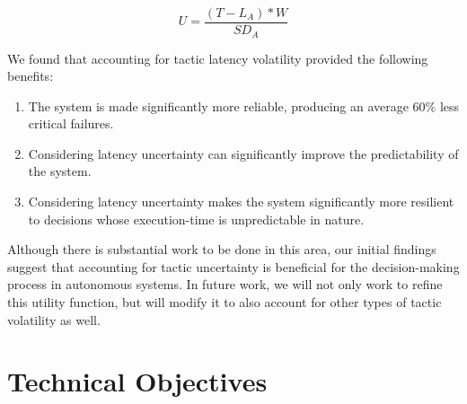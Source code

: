 \documentclass{article}
\begin{document}
\begin{equation} 
    U = \dfrac{(T - L_A)*W}{SD_A}
  	\label{eq:proposedLVA}
\end{equation}


We found that accounting for tactic latency volatility provided the following benefits:

\begin{enumerate}[noitemsep]
    
    \item The system is made significantly more reliable, producing an average 60\% less critical failures.
	\item Considering latency uncertainty can significantly improve the predictability of the system.
	\item Considering latency uncertainty makes the system significantly more resilient to decisions whose execution-time is unpredictable in nature.

\end{enumerate}
 
Although there is substantial work to be done in this area, our initial findings suggest that accounting for tactic uncertainty is beneficial for the decision-making process in autonomous systems. In future work, we will not only work to refine this utility function, but will modify it to also account for other types of tactic volatility as well.
 
 
 
 

















\section{Technical Objectives}
\end{document}

